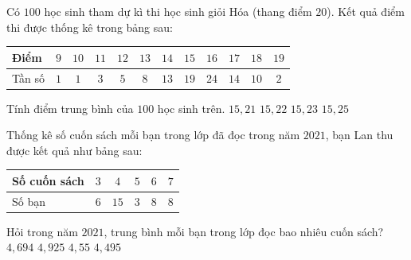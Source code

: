 \begin{ex}%
	Có $100$ học sinh tham dự kì thi học sinh giỏi Hóa (thang điểm $20$). Kết quả điểm thi được thống kê trong bảng sau:
	\begin{center}
		\begin{tabular}{|l|c|c|c|c|c|c|c|c|c|c|c|}
			\hline
			Điểm & $9$ & $10$ & $11$ & $12$ & $13$ & $14$ & $15$ & $16$ & $17$ & $18$ & $19$ \\
			\hline
			Tần số & $1$ & $1$ & $3$ & $5$ & $8$ & $13$ & $19$ & $24$ & $14$ & $10$ & $2$ \\
			\hline
		\end{tabular}
	\end{center}
	Tính điểm trung bình của $100$ học sinh trên.
	\choice
	{$15{,}21$}
	{$15{,}22$}
	{$15{,}23$}
	{\True $15{,}25$}
\end{ex}

\begin{ex}%
	Thống kê số cuốn sách mỗi bạn trong lớp đã đọc trong năm $2021$, bạn Lan thu được kết quả như bảng sau:
	\begin{center}
		\begin{tabular}{|l|c|c|c|c|c|}
			\hline
			Số cuốn sách & $3$ & $4$ & $5$ & $6$ & $7$ \\
			\hline
			Số bạn & $6$ & $15$ & $3$ & $8$ & $8$ \\
			\hline
		\end{tabular}
	\end{center}
	Hỏi trong năm $2021$, trung bình mỗi bạn trong lớp đọc bao nhiêu cuốn sách?
	\choice
	{$4{,}694$}
	{\True $4{,}925$}
	{$4{,}55$}
	{$4{,}495$}
\end{ex}


